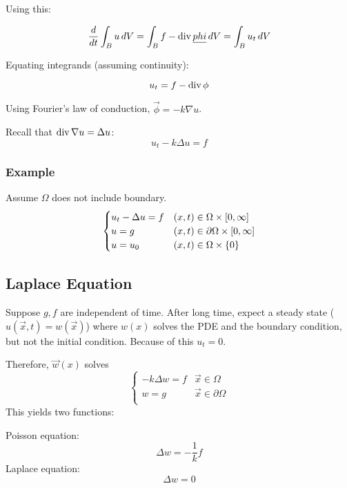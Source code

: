 \documentclass[main.tex]{subfiles}
\begin{document}
Using this:

$$\frac{d}{dt} \int_B u\,dV = \int_B f - \operatorname{div}{\underline{phi}}\,dV = \int_B u_t\, dV$$

Equating integrands (assuming continuity):

$$u_t = f - \operatorname{div}{\phi}$$

Using Fourier's law of conduction, $\vec{\phi} = -k\nabla u$.

Recall that $\operatorname{div}{\nabla u} = \Delta u$:
\begin{equation}
    \label{eq:heat-higher-dimensions}
    u_t - k\Delta u = f
\end{equation}

\subsubsection{Example}
Assume $\Omega$ does not include boundary.
$$
\begin{cases}
    u_t - \Delta u = f & (x, t) \in \Omega\times \interval{0}{\infty} \\
    u = g & (x, t) \in \partial \Omega \times \interval{0}{\infty} \\
    u = u_0 & (x, t) \in \Omega \times \{0\}
\end{cases}
$$


\subsection{Laplace Equation}
Suppose $g, f$ are independent of time. After long time, expect a steady state ($u(\vec{x}, t) = w(\vec{x})$) where $w(x)$ solves the PDE and the boundary condition, but not the initial condition. Because of this $u_t = 0$.

Therefore, $\vec{w}(x)$ solves
$$
\begin{cases}
    -k\Delta w = f & \vec{x} \in \Omega \\
    w = g & \vec{x} \in \partial\Omega \\
\end{cases}
$$
This yields two functions:

Poisson equation:
$$\Delta w = -\frac{1}{k} f$$
Laplace equation:
$$\Delta w = 0$$
\end{document}

